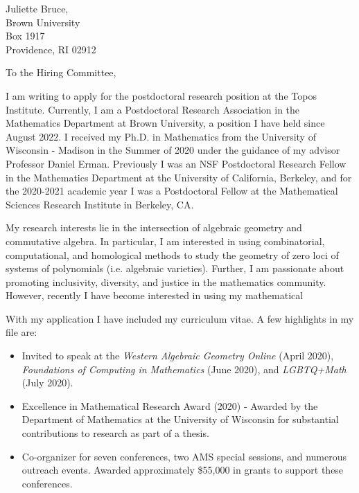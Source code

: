 \documentclass[11pt]{brownletter}
\date{October 9, 2022} %
\begin{document}
\begin{letter}{Juliette Bruce,\\ 
               Brown University\\ 
               Box 1917\\ 
               Providence, RI 02912}

\opening{To the Hiring Committee,}

I am writing to apply for the postdoctoral research position at the Topos Institute. Currently, I am a Postdoctoral Research Association in the Mathematics Department at Brown University, a position I have held since August 2022. I received my Ph.D. in Mathematics from the University of Wisconsin - Madison in the Summer of 2020 under the guidance of my advisor Professor Daniel Erman. Previously I was an NSF Postdoctoral Research Fellow in the Mathematics Department at the University of California, Berkeley, and for the 2020-2021 academic year I was a Postdoctoral Fellow at the Mathematical Sciences Research Institute in Berkeley, CA.

My research interests lie in the intersection of algebraic geometry and commutative algebra. In particular, I am interested in using combinatorial, computational, and homological methods to study the geometry of zero loci of systems of polynomials (i.e. algebraic varieties). Further, I am passionate about promoting inclusivity, diversity, and justice in the mathematics community. However, recently I have become interested in using my mathematical 

With my application I have included my curriculum vitae. A few highlights in my file are:
\begin{itemize}
\item Invited to speak at the \textit{Western Algebraic Geometry Online} (April 2020), \textit{Foundations of Computing in Mathematics} (June 2020), and \textit{LGBTQ+Math} (July 2020).

\item Excellence in Mathematical Research Award (2020) - Awarded by the Department of Mathematics at the University of Wisconsin for substantial contributions to research as part of a thesis. 

\item Co-organizer for seven conferences, two AMS special sessions, and numerous outreach events. Awarded approximately \$55,000 in grants to support these conferences.  


\end{itemize}
\end{letter}
\end{document}
